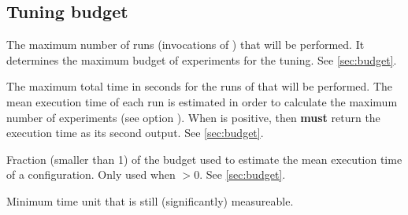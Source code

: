 \subsection[Tuning budget]{Tuning budget}
\begin{description}
The maximum number of runs (invocations of ) that will be performed. It determines the maximum budget of experiments for the tuning. See \autoref{sec:budget}.

The maximum total time in seconds for the runs of  that will be  performed. The mean execution time  of each run is estimated in order to calculate the maximum number of experiments (see option ).
  When  is positive, then  \textbf{must} return the execution time as its second output. See \autoref{sec:budget}.

Fraction (smaller than 1) of the budget used to estimate the mean execution time of a configuration. Only used when  $> 0$. See \autoref{sec:budget}.

Minimum time unit that is still (significantly) measureable.

\end{description}

